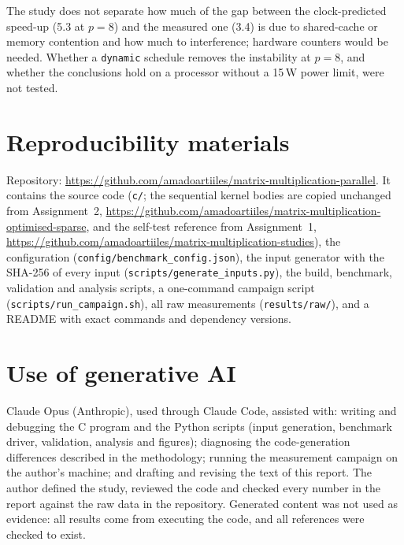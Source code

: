 \documentclass[11pt,a4paper]{article}
\newcommand{\concept}[1]{\par\addvspace{8pt}\Needspace{5\baselineskip}%
  \noindent{\color{accent}\bfseries\boldmath #1}\par\nopagebreak\vspace{2pt}}
\newcommand{\RepoURL}{https://github.com/amadoartiiles/matrix-multiplication-parallel}
\newcommand{\ATwoURL}{https://github.com/amadoartiiles/matrix-multiplication-optimised-sparse}
\newcommand{\AOneURL}{https://github.com/amadoartiiles/matrix-multiplication-studies}
\begin{document}
\concept{What remains unresolved}
The study does not separate how much of the gap between the clock-predicted speed-up (5.3 at
$p=8$) and the measured one (3.4) is due to shared-cache or memory contention and how much to
interference; hardware counters would be needed. Whether a \texttt{dynamic} schedule removes the
instability at $p=8$, and whether the conclusions hold on a processor without a 15\,W power
limit, were not tested.

\section*{Reproducibility materials}
Repository: \url{\RepoURL}. It contains the source code (\texttt{c/}; the sequential kernel bodies
are copied unchanged from Assignment~2, \url{\ATwoURL}, and the self-test reference from
Assignment~1, \url{\AOneURL}), the configuration (\texttt{config/benchmark\_config.json}), the
input generator with the SHA-256 of every input (\texttt{scripts/generate\_inputs.py}), the
build, benchmark, validation and analysis scripts, a one-command campaign script
(\texttt{scripts/run\_campaign.sh}), all raw measurements (\texttt{results/raw/}), and a README
with exact commands and dependency versions.

\section*{Use of generative AI}
Claude Opus (Anthropic), used through Claude Code, assisted with: writing and debugging the C
program and the Python scripts (input generation, benchmark driver, validation, analysis and
figures); diagnosing the code-generation differences described in the methodology; running the
measurement campaign on the author's machine; and drafting and revising the text of this report.
The author defined the study, reviewed the code and checked every number in the report against
the raw data in the repository. Generated content was not used as evidence: all results come
from executing the code, and all references were checked to exist.
\end{document}
